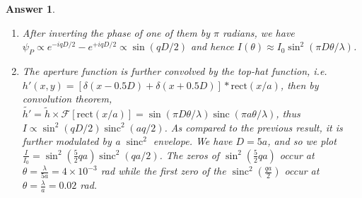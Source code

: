 \documentclass[a4paper]{article}
\DeclareMathOperator{\sinc}{sinc}
\newtheorem{ans}{Answer}[subsection]
\theoremstyle{new}
\begin{document}
\begin{ans}
\begin{enumerate}[label=(\alph*)]
Hence, $I(\theta)\approx I_0\cos^2(q\pi D\theta/\lambda)$, where by small angle approximation, $q=k\sin\theta\approx k\tan\theta=\frac{2\pi}{\lambda}\frac{x_0}{R}$. The ngular separation of the fringes is $\theta=\frac{\lambda}{D}=\frac{2(400\times10^{-9})}{0.1\times10^{-3}}=4\times10^{-3}$ rad.
\item After inverting the phase of one of them by $\pi$ radians, we have $\psi_P\propto e^{-iqD/2}-e^{+iqD/2}\propto\sin(qD/2)$ and hence $I(\theta)\approx I_0\sin^2(\pi D\theta/\lambda)$.
\item The aperture function is further convolved by the top-hat function, i.e. $h'(x,y)=[\delta(x-0.5D)+\delta(x+0.5D)]*\text{rect}(x/a)$, then by convolution theorem, $\tilde{h'}=\tilde{h}\times\mathcal{F}[\text{rect}(x/a)]=\sin(\pi D\theta/\lambda)\sinc(\pi a\theta/\lambda)$, thus $I\propto\sin^2(qD/2)\sinc^2(aq/2)$. As compared to the previous result, it is further modulated by a $\sinc^2$ envelope. We have $D=5a$, and so we plot $\frac{I}{I_0}=\sin^2(\frac{5}{2}qa)\sinc^2(qa/2)$. The zeros of $\sin^2(\frac{5}{2}qa)$ occur at $\theta=\frac{\lambda}{5a}=4\times10^{-3}$ rad while the first zero of the $\sinc^2(\frac{qa}{2})$ occur at $\theta=\frac{\lambda}{a}=0.02$ rad.
\pgfplotsset{ticks=none}
\begin{center}
\end{center}
\end{enumerate}
\end{ans}
\newpage
\end{document}
